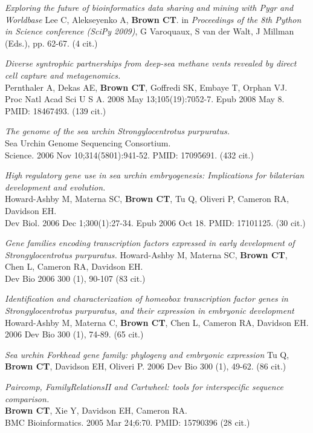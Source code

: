 \documentclass[margin,line]{resume}
\begin{document}
\begin{resume}
{\em Exploring the future of bioinformatics data sharing and mining
  with Pygr and Worldbase} Lee C, Alekseyenko A, {\bf Brown CT}.  in {\em
  Proceedings of the 8th Python in Science conference (SciPy 2009)}, G
Varoquaux, S van der Walt, J Millman (Eds.), pp. 62-67.  (4 cit.)

{\em Diverse syntrophic partnerships from deep-sea methane vents revealed by direct cell capture and metagenomics.}\\
Pernthaler A, Dekas AE, {\bf Brown CT}, Goffredi SK, Embaye T, Orphan VJ.\\
Proc Natl Acad Sci U S A. 2008 May
13;105(19):7052-7. Epub 2008 May 8.  PMID: 18467493.  (139 cit.)

{\em The genome of the sea urchin Strongylocentrotus purpuratus.}\\
Sea Urchin Genome Sequencing Consortium.\\
Science. 2006 Nov 10;314(5801):941-52.
PMID: 17095691.  (432 cit.)

{\em High regulatory gene use in sea urchin embryogenesis: Implications for bilaterian development and evolution.}\\
Howard-Ashby M, Materna SC, {\bf Brown CT}, Tu Q, Oliveri P, Cameron RA, Davidson EH.\\
Dev Biol. 2006 Dec 1;300(1):27-34. Epub 2006 Oct 18.
PMID: 17101125.  (30 cit.)

{\em Gene families encoding transcription factors expressed in early development of Strongylocentrotus purpuratus.}
Howard-Ashby M, Materna SC, {\bf Brown CT}, Chen L, Cameron RA, Davidson EH.\\
Dev Bio 2006 300 (1), 90-107 (83 cit.)

{\em Identification and characterization of homeobox transcription factor genes in Strongylocentrotus purpuratus, and their expression in embryonic development}
Howard-Ashby M, Materna C, {\bf Brown CT}, Chen L, Cameron RA, Davidson EH.
2006 Dev Bio 300 (1), 74-89.  (65 cit.)

{\em Sea urchin Forkhead gene family: phylogeny and embryonic expression}
Tu Q, {\bf Brown CT}, Davidson EH, Oliveri P.
2006 Dev Bio 300 (1), 49-62. (86 cit.)

{\em Paircomp, FamilyRelationsII and Cartwheel: tools for interspecific sequence comparison.}\\
{\bf Brown CT}, Xie Y, Davidson EH, Cameron RA.\\
BMC Bioinformatics. 2005 Mar 24;6:70.
PMID: 15790396 (28 cit.)


\end{resume}
\end{document}

